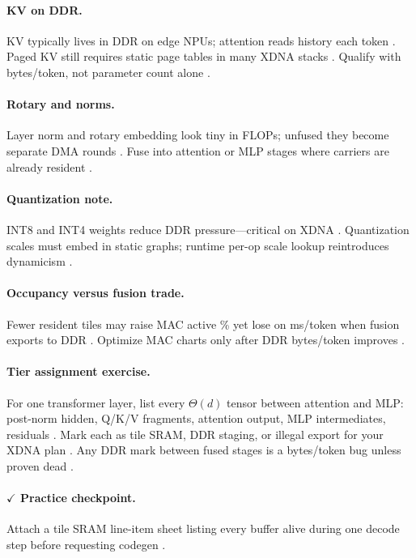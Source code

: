 \paragraph{KV on DDR.}
KV typically lives in DDR on edge NPUs; attention reads history each token \citep{kwon2023vllm,dao2023flashdecoding}.
Paged KV still requires static page tables in many XDNA stacks \citep{yirage2026,memoryfloor2026}.
Qualify with bytes/token, not parameter count alone \citep{taxbreak2026}.

\paragraph{Rotary and norms.}
Layer norm and rotary embedding look tiny in FLOPs; unfused they become separate DMA rounds \citep{taxbreak2026,amd2024aie}.
Fuse into attention or MLP stages where carriers are already resident \citep{dao2022flashattention,yirage2026}.

\paragraph{Quantization note.}
INT8 and INT4 weights reduce DDR pressure---critical on XDNA \citep{amd2024xdna,memoryfloor2026}.
Quantization scales must embed in static graphs; runtime per-op scale lookup reintroduces dynamicism \citep{amd2024aie,yirage2026}.

\paragraph{Occupancy versus fusion trade.}
Fewer resident tiles may raise MAC active \% yet lose on ms/token when fusion exports to DDR \citep{memoryfloor2026,patel2025llminference}.
Optimize MAC charts only after DDR bytes/token improves \citep{yirage2026}.

\paragraph{Tier assignment exercise.}
For one transformer layer, list every $\Theta(d)$ tensor between attention and MLP: post-norm hidden, Q/K/V fragments, attention output, MLP intermediates, residuals \citep{dao2022flashattention,memoryfloor2026}.
Mark each as tile SRAM, DDR staging, or illegal export for your XDNA plan \citep{yirage2026,chen2020compilerbasedhardw}.
Any DDR mark between fused stages is a bytes/token bug unless proven dead \citep{taxbreak2026,memoryfloor2026}.

\paragraph{$\checkmark$ Practice checkpoint.}
Attach a tile SRAM line-item sheet listing every buffer alive during one decode step before requesting codegen \citep{yirage2026,memoryfloor2026}.

